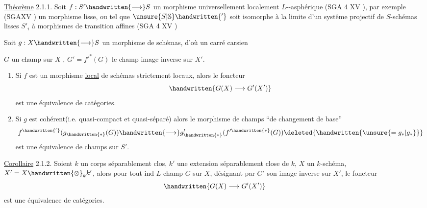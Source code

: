 \uline{Théorème} 2.1.1. Soit $f:S'\handwritten{\longrightarrow}S$ un morphisme universellement localement \uline{$L$}--asphérique (SGA 4 XV ), par exemple (SGAXV ) un morphisme lisse, ou tel que $\unsure{S|\mathbb{S}}\handwritten{'}$ soit isomorphe à la limite d'un systême projectif de $S$-schémas lisses $S'_i$ à morphismes de transition affines\deleted{\unsure{,}} (SGA 4 XV )

Soit $g:X\handwritten{\longrightarrow}S$ un morphisme de schémas, d'où un carré carsien

$G$ un champ sur $X$ , $G'=f'^*(G)$ le champ image inverse sur $X'$.

\begin{enumerate}[label=\alph*)]
\item Si  $f$ est un morphisme  \uline{local} de schémas strictement locaux, alors le foncteur
\[
\handwritten{G(X)\longrightarrow G'(X')}
\]
est une équivalence de catégories.

\item Si $g$ est cohérent(i.e. quasi-compact et quasi-séparé) alors le morphisme de champs ``de changement de base''
\[
f^{\handwritten{'}}(g_{\handwritten{*}}(G))\handwritten{\longrightarrow}g'_{\handwritten{*}}(f'^{\handwritten{*}}(G))\deleted{\handwritten{\unsure{=g_*|g_*}}}
\]
est une équivalence de champs sur $S'$.
\end{enumerate}

\uline{Corollaire} 2.1.2. Soient $k$ un corps séparablement clos, $k'$ une extension séparablement close de $k$, $X$ un $k$-schéma, $X'=X\handwritten{\otimes}_k k'$, alors pour tout  ind-\uline{$L$}-champ $G$ sur $X$, désignant par $G'$ son image inverse sur $X'$, le foncteur
\[
\handwritten{G(X)\longrightarrow G'(X')}
\]
est une équivalence de catégories.

